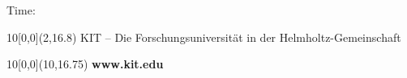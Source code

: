 \begin{titlepage}
    \vspace{1.5cm}
    \begin{center}
        \large{{Time}: \thesistimestart }
    \end{center}



    \begin{textblock}{10}[0,0](2,16.8)
        \tiny{KIT – Die Forschungsuniversität in der Helmholtz-Gemeinschaft}
    \end{textblock}
    \begin{textblock}{10}[0,0](10,16.75)
        \large{\textbf{www.kit.edu}}
    \end{textblock}
\end{titlepage}
